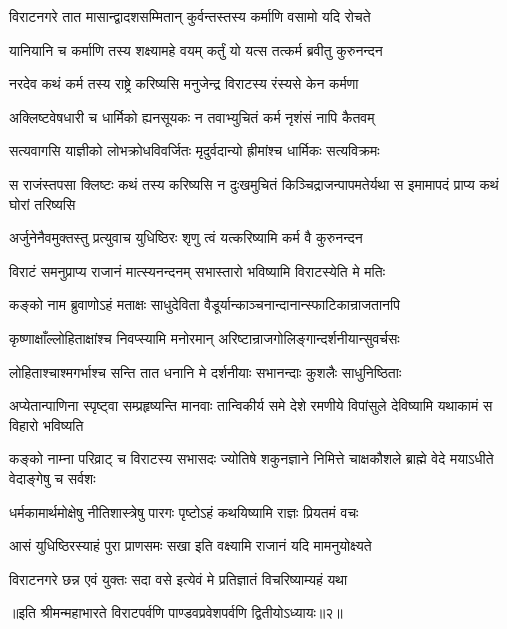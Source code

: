\twolineshloka
{विराटनगरे तात मासान्द्वादशसम्मितान्}
{कुर्वन्तस्तस्य कर्माणि वसामो यदि रोचते}


\twolineshloka
{यानियानि च कर्माणि तस्य शक्ष्यामहे वयम्}
{कर्तुं यो यत्स तत्कर्म ब्रवीतु कुरुनन्दन}



\twolineshloka
{नरदेव कथं कर्म तस्य राष्ट्रे करिष्यसि}
{मनुजेन्द्र विराटस्य रंस्यसे केन कर्मणा}


\twolineshloka
{अक्लिष्टवेषधारी च धार्मिको ह्यनसूयकः}
{न तवाभ्युचितं कर्म नृशंसं नापि कैतवम्}


\twolineshloka
{सत्यवागसि याज्ञीको लोभक्रोधविवर्जितः}
{मृदुर्वदान्यो ह्रीमांश्च धार्मिकः सत्यविक्रमः}


\threelineshloka
{स राजंस्तपसा क्लिष्टः कथं तस्य करिष्यसि}
{न दुःखमुचितं किञ्चिद्राजन्पापमतेर्यथा}
{स इमामापदं प्राप्य कथं घोरां तरिष्यसि}



\twolineshloka
{अर्जुनेनैवमुक्तस्तु प्रत्युवाच युधिष्ठिरः}
{शृणु त्वं यत्करिष्यामि कर्म वै कुरुनन्दन}


\twolineshloka
{विराटं समनुप्राप्य राजानं मात्स्यनन्दनम्}
{सभास्तारो भविष्यामि विराटस्येति मे मतिः}


\twolineshloka
{कङ्को नाम ब्रुवाणोऽहं मताक्षः साधुदेविता}
{वैडूर्यान्काञ्चनान्दानान्स्फाटिकान्राजतानपि}


\twolineshloka
{कृष्णाक्षाँल्लोहिताक्षांश्च निवप्स्यामि मनोरमान्}
{अरिष्टान्राजगोलिङ्गान्दर्शनीयान्सुवर्चसः}


\twolineshloka
{लोहिताश्चाश्मगर्भाश्च सन्ति तात धनानि मे}
{दर्शनीयाः सभानन्दाः कुशलैः साधुनिष्ठिताः}


\onelineshloka
{अप्येतान्पाणिना स्पृष्ट्वा सम्प्रहृष्यन्ति मानवाः}
\twolineshloka
{तान्विकीर्य समे देशे रमणीये विपांसुले}
{देविष्यामि यथाकामं स विहारो भविष्यति}


\threelineshloka
{कङ्को नाम्ना परिव्राट् च विराटस्य सभासदः}
{ज्योतिषे शकुनज्ञाने निमित्ते चाक्षकौशले}
{ब्राह्मे वेदे मयाऽधीते वेदाङ्गेषु च सर्वशः}


\twolineshloka
{धर्मकामार्थमोक्षेषु नीतिशास्त्रेषु पारगः}
{पृष्टोऽहं कथयिष्यामि राज्ञः प्रियतमं वचः}


\twolineshloka
{आसं युधिष्ठिरस्याहं पुरा प्राणसमः सखा}
{इति वक्ष्यामि राजानं यदि मामनुयोक्ष्यते}


\twolineshloka
{विराटनगरे छन्न एवं युक्तः सदा वसे}
{इत्येवं मे प्रतिज्ञातं विचरिष्याम्यहं यथा}

॥इति श्रीमन्महाभारते विराटपर्वणि पाण्डवप्रवेशपर्वणि द्वितीयोऽध्यायः॥२॥

